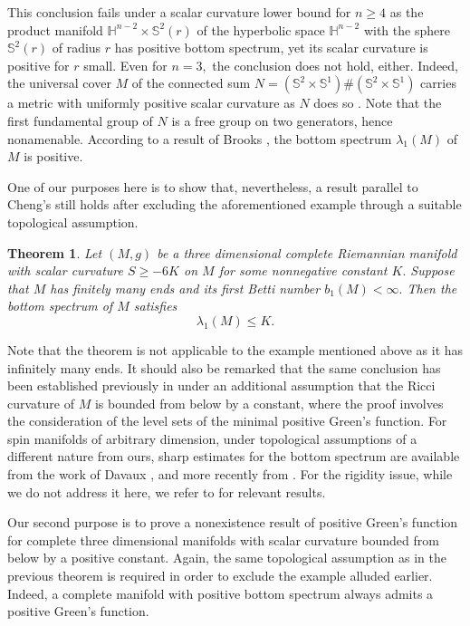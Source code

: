 \documentclass{amsart}
\newtheorem{theorem}{Theorem}[section]
\numberwithin{equation}{section}
\begin{document}
This conclusion fails under a scalar curvature lower bound for $n\geq 4$ as the product manifold $\mathbb{H}^{n-2}\times \mathbb{S}^2(r)$ of the hyperbolic space
$\mathbb{H}^{n-2}$ with the sphere $\mathbb{S}^2(r)$ of radius $r$ has positive bottom spectrum, yet its scalar curvature is positive for $r$ small. 
Even for $n=3,$ the conclusion does not hold, either. Indeed, the universal cover $M$ of the connected sum 
$N=\left(\mathbb{S}^2\times \mathbb{S}^{1}\right)\#\left(\mathbb{S}^2\times \mathbb{S}^{1}\right)$ carries a metric with uniformly positive scalar curvature 
as $N$ does so \cite{GL, SY1}. Note that the first fundamental group of $N$ is a free group on two generators, hence nonamenable.
According to a result of Brooks \cite{B}, the bottom spectrum $\lambda_1(M)$ of $M$ is positive. 

One of our purposes here is to show that, nevertheless, a result parallel to Cheng's still holds after excluding the aforementioned example through
a suitable topological assumption.

\begin{theorem}
\label{A} Let $\left( M,g\right) $ be a three dimensional complete
Riemannian manifold with scalar curvature $S\geq -6K$ on $M$ for some
nonnegative constant $K.$ Suppose that $M$ has finitely many ends and its
first Betti number $b_{1}(M)<\infty.$ Then the bottom spectrum of $M$
satisfies
\begin{equation*}
\lambda _{1}\left( M\right) \leq K.
\end{equation*}
\end{theorem}

Note that the theorem is not applicable to the example mentioned above as it has infinitely many ends. 
It should also be remarked that the same conclusion has been established previously in \cite{MW} under an additional assumption that the Ricci curvature
of $M$ is bounded from below by a constant, where the proof involves the consideration of the level sets of the minimal positive Green's function. 
For spin manifolds of arbitrary dimension, under topological assumptions of a different nature from ours, sharp estimates for the bottom spectrum are available 
from the work of Davaux \cite{D}, and more recently from \cite{WZ1, Liu}. For the rigidity issue, while we do not address it here, we refer to \cite{MW, WZ2, BC}
for relevant results.

Our second purpose is to prove a nonexistence result of positive Green's function for complete three dimensional manifolds with scalar curvature bounded from below
by a positive constant. Again, the same topological assumption as in the previous theorem is required in order to exclude the example alluded earlier. Indeed,
a complete manifold with positive bottom spectrum always admits a positive Green's function.
\end{document}
